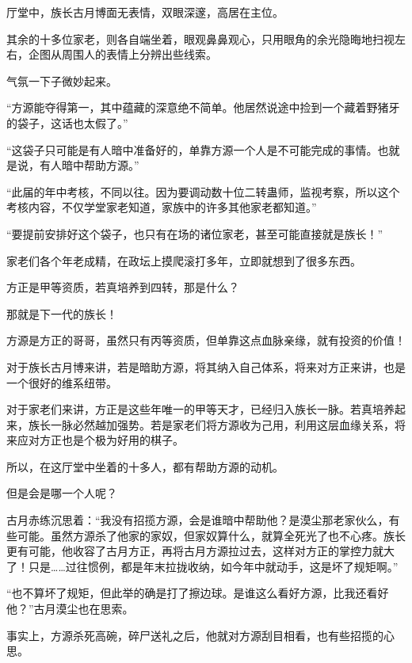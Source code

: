 
\begin{this_body}



厅堂中，族长古月博面无表情，双眼深邃，高居在主位。

其余的十多位家老，则各自端坐着，眼观鼻鼻观心，只用眼角的余光隐晦地扫视左右，企图从周围人的表情上分辨出些线索。

气氛一下子微妙起来。

“方源能夺得第一，其中蕴藏的深意绝不简单。他居然说途中捡到一个藏着野猪牙的袋子，这话也太假了。”

“这袋子只可能是有人暗中准备好的，单靠方源一个人是不可能完成的事情。也就是说，有人暗中帮助方源。”

“此届的年中考核，不同以往。因为要调动数十位二转蛊师，监视考察，所以这个考核内容，不仅学堂家老知道，家族中的许多其他家老都知道。”

“要提前安排好这个袋子，也只有在场的诸位家老，甚至可能直接就是族长！”

家老们各个年老成精，在政坛上摸爬滚打多年，立即就想到了很多东西。

方正是甲等资质，若真培养到四转，那是什么？

那就是下一代的族长！

方源是方正的哥哥，虽然只有丙等资质，但单靠这点血脉亲缘，就有投资的价值！

对于族长古月博来讲，若是暗助方源，将其纳入自己体系，将来对方正来讲，也是一个很好的维系纽带。

对于家老们来讲，方正是这些年唯一的甲等天才，已经归入族长一脉。若真培养起来，族长一脉必然越加强势。若是家老们将方源收为己用，利用这层血缘关系，将来应对方正也是个极为好用的棋子。

所以，在这厅堂中坐着的十多人，都有帮助方源的动机。

但是会是哪一个人呢？

古月赤练沉思着：“我没有招揽方源，会是谁暗中帮助他？是漠尘那老家伙么，有些可能。虽然方源杀了他家的家奴，但家奴算什么，就算全死光了也不心疼。族长更有可能，他收容了古月方正，再将古月方源拉过去，这样对方正的掌控力就大了！只是……过往惯例，都是年末拉拢收纳，如今年中就动手，这是坏了规矩啊。”

“也不算坏了规矩，但此举的确是打了擦边球。是谁这么看好方源，比我还看好他？”古月漠尘也在思索。

事实上，方源杀死高碗，碎尸送礼之后，他就对方源刮目相看，也有些招揽的心思。


\end{this_body}
